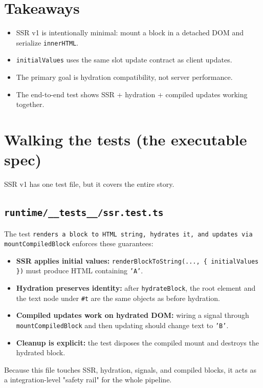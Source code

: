 \section{Takeaways}

\begin{itemize}
  \item SSR v1 is intentionally minimal: mount a block in a detached DOM and serialize \texttt{innerHTML}.
  \item \texttt{initialValues} uses the same slot update contract as client updates.
  \item The primary goal is hydration compatibility, not server performance.
  \item The end-to-end test shows SSR + hydration + compiled updates working together.
\end{itemize}

\section{Walking the tests (the executable spec)}

SSR v1 has one test file, but it covers the entire story.

\subsection{\texttt{runtime/\_\_tests\_\_/ssr.test.ts}}

The test \texttt{renders a block to HTML string, hydrates it, and updates via mountCompiledBlock} enforces these guarantees:

\begin{itemize}
  \item \textbf{SSR applies initial values:} \texttt{renderBlockToString(..., \{ initialValues \})} must produce HTML containing \texttt{'A'}.
  \item \textbf{Hydration preserves identity:} after \texttt{hydrateBlock}, the root element and the text node under \texttt{\#t} are the same objects as before hydration.
  \item \textbf{Compiled updates work on hydrated DOM:} wiring a signal through \texttt{mountCompiledBlock} and then updating should change text to \texttt{'B'}.
  \item \textbf{Cleanup is explicit:} the test disposes the compiled mount and destroys the hydrated block.
\end{itemize}

Because this file touches SSR, hydration, signals, and compiled blocks, it acts as a integration-level "safety rail" for the whole pipeline.

